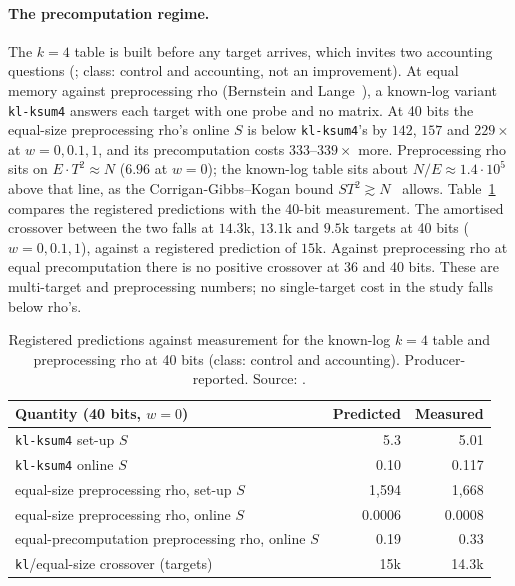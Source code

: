 \paragraph{The precomputation regime.} The $k=4$ table is built before any
target arrives, which invites two accounting questions
(; class: control and
accounting, not an improvement). At equal memory against preprocessing rho
(Bernstein and Lange~\cite{bl2012}), a known-log variant
\texttt{kl-ksum4} answers each target with one probe and no matrix. At 40
bits the equal-size preprocessing rho's online $S$ is below
\texttt{kl-ksum4}'s by $142$, $157$ and $229\times$ at $w=0,0.1,1$, and its
precomputation costs $333$--$339\times$ more. Preprocessing rho sits on
$E\cdot T^2\approx N$ ($6.96$ at $w=0$); the known-log table sits about
$N/E\approx1.4\cdot10^5$ above that line, as the Corrigan-Gibbs--Kogan bound
$ST^2\gtrsim N$~\cite{cgk2018} allows. Table~\ref{tab:pg-precompute} compares the registered
predictions with the 40-bit measurement. The amortised crossover between the
two falls at $14.3$k, $13.1$k and $9.5$k targets at 40 bits
($w=0,0.1,1$), against a registered prediction of $15$k. Against
preprocessing rho at equal precomputation there is no positive crossover
at 36 and 40 bits. These are multi-target and preprocessing numbers; no
single-target cost in the study falls below rho's.

\begin{table}[t]
\centering\small
\begin{tabular}{@{}lrr@{}}
\toprule
Quantity (40 bits, $w=0$) & Predicted & Measured \\
\midrule
\texttt{kl-ksum4} set-up $S$ & 5.3 & 5.01 \\
\texttt{kl-ksum4} online $S$ & 0.10 & 0.117 \\
equal-size preprocessing rho, set-up $S$ & 1{,}594 & 1{,}668 \\
equal-size preprocessing rho, online $S$ & 0.0006 & 0.0008 \\
equal-precomputation preprocessing rho, online $S$ & 0.19 & 0.33 \\
\texttt{kl}/equal-size crossover (targets) & 15k & 14.3k \\
\bottomrule
\end{tabular}
\caption[]{Registered predictions against measurement for the known-log
$k=4$ table and preprocessing rho at 40 bits (class: control and
accounting). Producer-reported. Source:
.}
\label{tab:pg-precompute}
\end{table}

